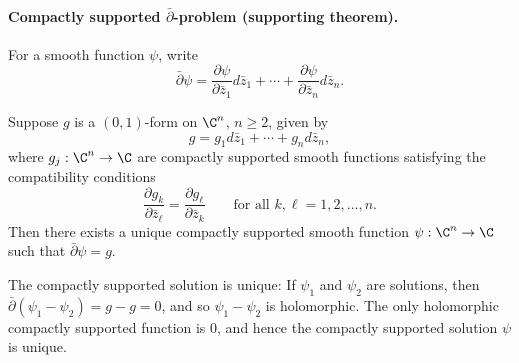 
\paragraph{Compactly supported $\bar\partial$-problem (supporting theorem).}
For a smooth function $\psi$, write
\[
\bar\partial\psi=\frac{\partial\psi}{\partial\bar z_1}d\bar z_1+\cdots+\frac{\partial\psi}{\partial\bar z_n}d\bar z_n.
\]
\begin{thm}
Suppose $g$ is a $(0,1)$-form on $\C^n$, $n\geq2$, given by
\[g=g_1d\bar z_1+\cdots+g_nd\bar z_n,\]
where $g_j:\C^n\to\C$ are compactly supported smooth functions satisfying the compatibility conditions
\begin{equation}\label{eq:compatconds}
\frac{\partial g_k}{\partial\bar z_\ell}=\frac{\partial g_\ell}{\partial\bar z_k}\qquad\text{for all }k,\ell=1,2,\ldots,n.
\end{equation}
Then there exists a unique compactly supported smooth function $\psi:\C^n\to\C$ such that $\bar\partial\psi=g$.
\end{thm}
The compactly supported solution is unique: If $\psi_1$ and $\psi_2$ are solutions, then $\bar\partial(\psi_1-\psi_2)=g-g=0$, and so $\psi_1-\psi_2$ is holomorphic. The only holomorphic compactly supported function is $0$, and hence the compactly supported solution $\psi$ is unique.
